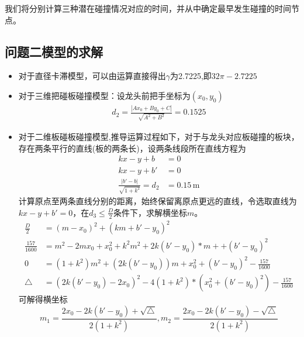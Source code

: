 \documentclass[withoutpreface,bwprint]{cumcmthesis}
\begin{document}
我们将分别计算三种潜在碰撞情况对应的时间，并从中确定最早发生碰撞的时间节点。

\subsection{问题二模型的求解}
\begin{itemize}
	\item 对于直径卡滞模型，可以由运算直接得出$\gamma$为2.7225,即$32\pi-2.7225$
	\item 对于三维把碰板碰撞模型：设龙头前把手坐标为$(x_0,y_0)$
	\begin{align*}
	d_2 =\frac{|Ax_0+By_0+C|}{\sqrt{A^2+B^2}} =0.1525
	\end{align*}
	\item 对于二维板碰板碰撞模型,推导运算过程如下，对于与龙头对应板碰撞的板块，存在两条平行的直线(板的两条长)，设两条线段所在直线方程为
\begin{align*}
	kx - y + b &= 0 \\
	kx - y + b' &= 0 \\
	\frac{\lvert b' - b \rvert}{\sqrt{1 + k^2}} = d_2 &= 0.15 \, \text{m}
\end{align*}
	计算原点至两条直线分别的距离，始终保留离原点更远的直线，令选取直线为$kx - y + b' = 0$，在$	d_3 \leq \frac{D}{2}$条件下，求解横坐标$m$。
\begin{align*}
	\frac{D}{2}&= (m-x_0)^2 + (km+b'-y_0)^2 \\
	\frac{157}{1600}&=m^2-2mx_0+x_0^2+k^2m^2+2k(b'-y_0)*m++(b'-y_0)^2\\
	0&=(1+k^2)m^2+(2k(b'-y_0))m+x_0^2+(b'-y_0)^2-\frac{157}{1600}\\
	 \triangle&= (2k(b'-y_0)-2x_0)^2-4(1+k^2)*(x_0^2+(b'-y_0)^2)-\frac{157}{1600}
\end{align*}
可解得横坐标\\$$m_1 = \frac{2x_0-2k(b'-y_0)+\sqrt{\triangle}}{2(1+k^2)}, m_2 = \frac{2x_0-2k(b'-y_0)-\sqrt{\triangle}}{2(1+k^2)}$$


\end{itemize}
\end{document}
